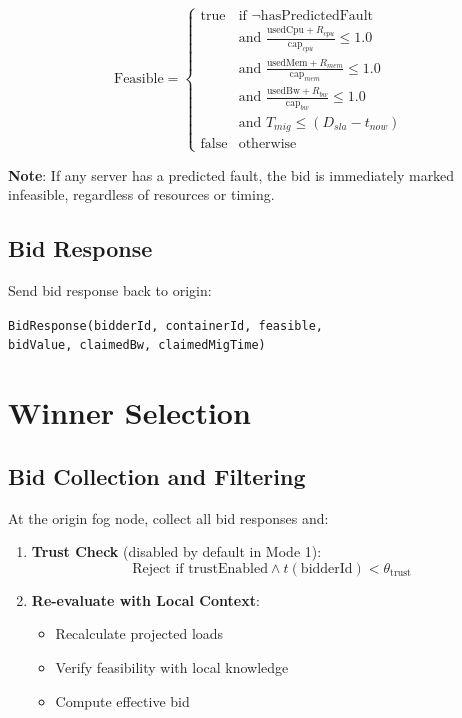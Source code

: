 \documentclass[12pt,a4paper]{article}
\begin{document}
\begin{equation}
    \text{Feasible} = \begin{cases}
        \text{true} & \text{if } \neg\text{hasPredictedFault} \\
        & \text{and } \frac{\text{usedCpu} + R_{cpu}}{\text{cap}_{cpu}} \leq 1.0 \\
        & \text{and } \frac{\text{usedMem} + R_{mem}}{\text{cap}_{mem}} \leq 1.0 \\
        & \text{and } \frac{\text{usedBw} + R_{bw}}{\text{cap}_{bw}} \leq 1.0 \\
        & \text{and } T_{mig} \leq (D_{sla} - t_{now}) \\
        \text{false} & \text{otherwise}
    \end{cases}
\end{equation}

\textbf{Note}: If any server has a predicted fault, the bid is immediately marked infeasible, regardless of resources or timing.

\subsection{Bid Response}

Send bid response back to origin:
\begin{center}
\texttt{BidResponse(bidderId, containerId, feasible,}\\
\texttt{bidValue, claimedBw, claimedMigTime)}
\end{center}

\section{Winner Selection}

\subsection{Bid Collection and Filtering}

At the origin fog node, collect all bid responses and:

\begin{enumerate}
    \item \textbf{Trust Check} (disabled by default in Mode 1):
    \begin{equation}
        \text{Reject if } \text{trustEnabled} \land t(\text{bidderId}) < \theta_{\text{trust}}
    \end{equation}
    
    \item \textbf{Re-evaluate with Local Context}:
    \begin{itemize}
        \item Recalculate projected loads
        \item Verify feasibility with local knowledge
        \item Compute effective bid
    \end{itemize}
\end{enumerate}
\end{document}
